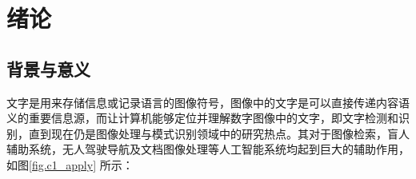 ﻿%
%
%
%
%
%

\chapter{绪论}


    \section{背景与意义}

    文字是用来存储信息或记录语言的图像符号，图像中的文字是可以直接传递内容语义的重要信息源，而让计算机能够定位并理解数字图像中的文字，即文字检测和识别，直到现在仍是图像处理与模式识别领域中的研究热点。其对于图像检索，盲人辅助系统，无人驾驶导航及文档图像处理等人工智能系统均起到巨大的辅助作用，如图\ref{fig.c1_apply} 所示：

